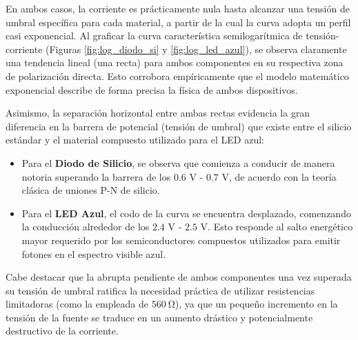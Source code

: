 En ambos casos, la corriente es prácticamente nula hasta alcanzar una tensión de umbral específica para cada material, a partir de la cual la curva adopta un perfil casi exponencial. Al graficar la curva característica semilogarítmica de tensión-corriente (Figuras \ref{fig:log_diodo_si} y \ref{fig:log_led_azul}), se observa claramente una tendencia lineal (una recta) para ambos componentes en su respectiva zona de polarización directa. Esto corrobora empíricamente que el modelo matemático exponencial describe de forma precisa la física de ambos dispositivos. 

Asimismo, la separación horizontal entre ambas rectas evidencia la gran diferencia en la barrera de potencial (tensión de umbral) que existe entre el silicio estándar y el material compuesto utilizado para el LED azul:
\begin{itemize}
    \item Para el \textbf{Diodo de Silicio}, se observa que comienza a conducir de manera notoria superando la barrera de los $0.6$ V - $0.7$ V, de acuerdo con la teoría clásica de uniones P-N de silicio.
    \item Para el \textbf{LED Azul}, el codo de la curva se encuentra desplazado, comenzando la conducción alrededor de los $2.4$ V - $2.5$ V. Esto responde al salto energético mayor requerido por los semiconductores compuestos utilizados para emitir fotones en el espectro visible azul. 
\end{itemize}

Cabe destacar que la abrupta pendiente de ambos componentes una vez superada su tensión de umbral ratifica la necesidad práctica de utilizar resistencias limitadoras (como la empleada de $\SI{560}{\ohm}$), ya que un pequeño incremento en la tensión de la fuente se traduce en un aumento drástico y potencialmente destructivo de la corriente.